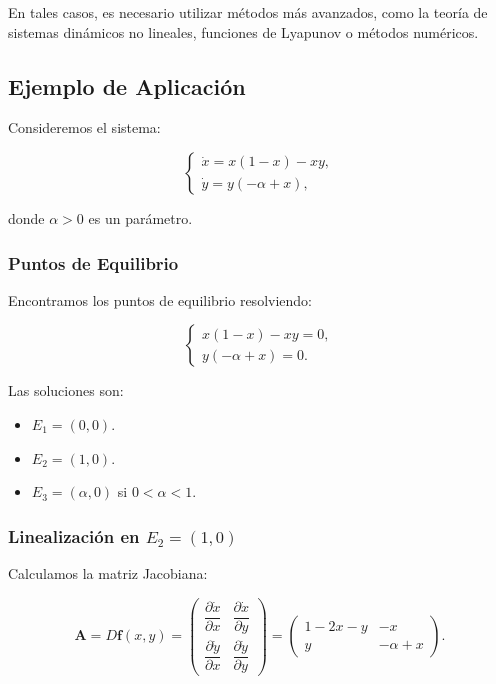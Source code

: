 \documentclass[12pt, a4paper]{report}
\begin{document}
En tales casos, es necesario utilizar métodos más avanzados, como la teoría de sistemas dinámicos no lineales, funciones de Lyapunov o métodos numéricos.

\subsection{Ejemplo de Aplicación}

Consideremos el sistema:

\begin{equation}\label{eq:ejemplo_sistema}
    \begin{cases}
        \dot{x} = x (1 - x) - xy, \\
        \dot{y} = y (-\alpha + x),
    \end{cases}
\end{equation}

donde \( \alpha > 0 \) es un parámetro.

\subsubsection{Puntos de Equilibrio}

Encontramos los puntos de equilibrio resolviendo:

\begin{equation}
    \begin{cases}
        x (1 - x) - x y = 0, \\
        y (-\alpha + x) = 0.
    \end{cases}
\end{equation}

Las soluciones son:

\begin{itemize}
    \item \( E_1 = (0, 0) \).
    \item \( E_2 = (1, 0) \).
    \item \( E_3 = (\alpha, 0) \) si \( 0 < \alpha < 1 \).
\end{itemize}

\subsubsection{Linealización en \( E_2 = (1, 0) \)}

Calculamos la matriz Jacobiana:

\begin{equation}
    \mathbf{A} = D\mathbf{f}(x, y) =
    \begin{pmatrix}
        \dfrac{\partial \dot{x}}{\partial x} & \dfrac{\partial \dot{x}}{\partial y} \\
        \dfrac{\partial \dot{y}}{\partial x} & \dfrac{\partial \dot{y}}{\partial y}
    \end{pmatrix}
    =
    \begin{pmatrix}
        1 - 2x - y & -x \\
        y & -\alpha + x
    \end{pmatrix}.
\end{equation}
\end{document}
